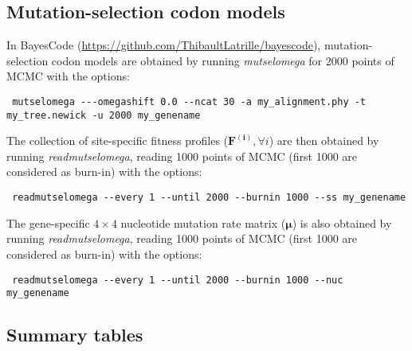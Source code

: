 \documentclass[12pt]{article}
\newcommand{\UniDimArray}[1]{\bm{#1}}
\begin{document}
    \subsection{Mutation-selection codon models}
    \label{sec:site-specific-mutation-selection-codon-models}
    In BayesCode (\url{https://github.com/ThibaultLatrille/bayescode}), mutation-selection codon models are obtained by running \textit{mutselomega} for 2000 points of MCMC with the options:
    \begin{scriptsize}
        \begin{verbatim}
 mutselomega ---omegashift 0.0 --ncat 30 -a my_alignment.phy -t my_tree.newick -u 2000 my_genename
        \end{verbatim}
    \end{scriptsize}
    The collection of site-specific fitness profiles ($\UniDimArray{F^{(i)}}, \forall i$) are then obtained by running \textit{readmutselomega}, reading 1000 points of MCMC (first 1000 are considered as burn-in) with the options:
    \begin{scriptsize}
        \begin{verbatim}
 readmutselomega --every 1 --until 2000 --burnin 1000 --ss my_genename
        \end{verbatim}
    \end{scriptsize}
    The gene-specific $4 \times 4$ nucleotide mutation rate matrix ($\UniDimArray{\mu}$) is also obtained by running \textit{readmutselomega}, reading 1000 points of MCMC (first 1000 are considered as burn-in) with the options:
    \begin{scriptsize}
        \begin{verbatim}
 readmutselomega --every 1 --until 2000 --burnin 1000 --nuc my_genename
        \end{verbatim}
    \end{scriptsize}

    \subsection{Summary tables}\label{subsec:summary-table-mutsel}
\end{document}
